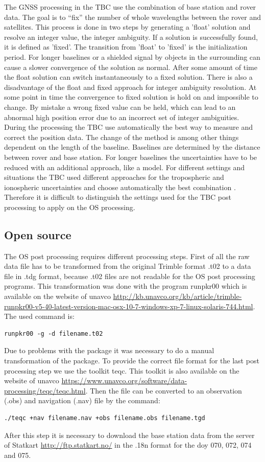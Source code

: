 The GNSS processing in the TBC use the combination of base station and rover data.
The goal is to “fix” the number of whole wavelengths between the rover and satellites.
This process is done in two steps by generating a 'float' solution and resolve an integer value, the integer ambiguity. 
If a solution is successfully found, it is defined as 'fixed'.
The transition from 'float' to 'fixed' is the initialization period.
For longer baselines or a shielded signal by objects in the surrounding can cause a slower convergence of the solution as normal.
After some amount of time the float solution can switch instantaneously to a fixed solution.
There is also a disadvantage of the float and fixed approach for integer ambiguity resolution.
At some point in time the convergence to fixed solution is hold on and impossible to change.
By mistake a wrong fixed value can be held, which can lead to an abnormal high position error due to an incorrect set of integer ambiguities.
During the processing the TBC use automatically the best way to measure and correct the position data. 
The change of the method is among other things dependent on the length of the baseline.
Baselines are determined by the distance between rover and base station.
For longer baselines the uncertainties have to be reduced with an additional approach, like a model.
For different settings and situations the TBC used different approaches for the tropospheric and ionospheric uncertainties and choose automatically the best combination \citep{Trprocess}.
Therefore it is difficult to distinguish the settings used for the TBC post processing to apply on the OS processing.

\subsection{Open source}

The OS post processing requires different processing steps.
First of all the raw data file has to be transformed from the original Trimble format .t02 to a data file in .tdg format, because .t02 files are not readable for the OS post processing programs.
This transformation was done with the program runpkr00 which is available on the website of unavco \url{http://kb.unavco.org/kb/article/trimble-runpkr00-v5-40-latest-version-mac-osx-10-7-windows-xp-7-linux-solaris-744.html}.
The used command is: 
\begin{verbatim} 
runpkr00 -g -d filename.t02 
\end{verbatim}
Due to problems with the package it was necessary to do a manual transformation of the package.
To provide the correct file format for the last post processing step we use the toolkit teqc.
This toolkit is also available on the website of unavco \url{https://www.unavco.org/software/data-processing/teqc/teqc.html}.
Then the file can be converted to an observation (.obs) and navigation (.nav) file by the command:
\begin{verbatim}
./teqc +nav filename.nav +obs filename.obs filename.tgd
\end{verbatim}
After this step it is necessary to download the base station data from the server of Statkart \url{http://ftp.statkart.no/} in the .18n format for the doy 070, 072, 074 and 075.
\medskip

